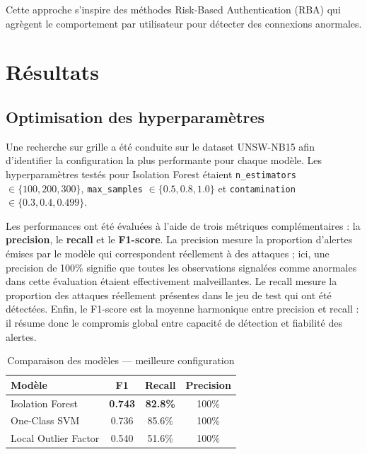 \documentclass[11pt,a4paper]{article}
\begin{document}
Cette approche s'inspire des méthodes Risk-Based Authentication (RBA)
\cite{rba} qui agrègent le comportement par utilisateur pour détecter
des connexions anormales.

\section{Résultats}

\subsection{Optimisation des hyperparamètres}

Une recherche sur grille a été conduite sur le dataset UNSW-NB15 afin
d'identifier la configuration la plus performante pour chaque modèle. Les
hyperparamètres testés pour Isolation Forest étaient
\texttt{n\_estimators} $\in \{100, 200, 300\}$,
\texttt{max\_samples} $\in \{0.5, 0.8, 1.0\}$ et
\texttt{contamination} $\in \{0.3, 0.4, 0.499\}$.

Les performances ont été évaluées à l'aide de trois métriques
complémentaires : la \textbf{precision}, le \textbf{recall} et le
\textbf{F1-score}. La precision mesure la proportion d'alertes émises par
le modèle qui correspondent réellement à des attaques ; ici, une precision
de 100\% signifie que toutes les observations signalées comme anormales
dans cette évaluation étaient effectivement malveillantes. Le recall mesure
la proportion des attaques réellement présentes dans le jeu de test qui ont
été détectées. Enfin, le F1-score est la moyenne harmonique entre precision
et recall : il résume donc le compromis global entre capacité de détection
et fiabilité des alertes.

\begin{table}[H]
\centering
\caption{Comparaison des modèles — meilleure configuration}
\begin{tabular}{lccc}
\toprule
\textbf{Modèle} & \textbf{F1} & \textbf{Recall} & \textbf{Precision} \\
\midrule
Isolation Forest & \textbf{0.743} & \textbf{82.8\%} & 100\% \\
One-Class SVM    & 0.736          & 85.6\%          & 100\% \\
Local Outlier Factor & 0.540      & 51.6\%          & 100\% \\
\bottomrule
\end{tabular}
\end{table}
\end{document}
